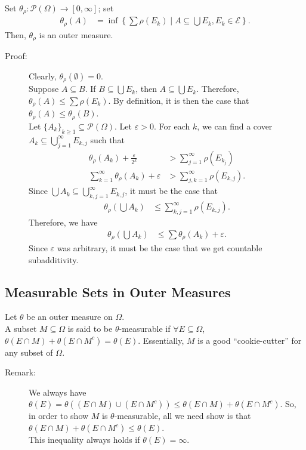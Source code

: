 \documentclass[10pt]{extarticle}
\begin{document}
  Set $\theta_{\rho}: \mathcal{P}(\Omega) \rightarrow [0,\infty]$; set
  \begin{align*}
    \theta_{\rho}(A) &= \inf \left\{\sum \rho(E_k)\mid A\subseteq \bigcup E_k,E_k\in \mathcal{E}\right\}.
  \end{align*}
  Then, $\theta_{\rho}$ is an outer measure.
  \begin{description}
    \item[Proof:] Clearly, $\theta_{\rho}(\emptyset) = 0$.\\

      Suppose $A\subseteq B$. If $B\subseteq \bigcup E_k$, then $A\subseteq \bigcup E_k$. Therefore, $\theta_{\rho}(A)\leq \sum \rho(E_k)$. By definition, it is then the case that $\theta_{\rho}(A)\leq \theta_{\rho}(B)$.\\

      Let $\{A_k\}_{k\geq 1}\subseteq \mathcal{P}(\Omega)$. Let $\varepsilon > 0$. For each $k$, we can find a cover $A_k\subseteq \bigcup_{j=1}^{\infty} E_{k,j}$ such that
      \begin{align*}
        \theta_{\rho}(A_k) + \frac{\varepsilon}{2^k} &> \sum_{j=1}^{\infty}\rho(E_{k_j})\\
        \sum_{k=1}^{\infty}\theta_{\rho}(A_k) + \varepsilon &> \sum_{j,k=1}^{\infty}\rho(E_{k,j}).
      \end{align*}
      Since $\bigcup A_k \subseteq \bigcup_{k,j=1}^{\infty}E_{k,j}$, it must be the case that
      \begin{align*}
        \theta_{\rho}\left(\bigcup A_k\right) &\leq \sum_{k,j=1}^{\infty}\rho(E_{k,j}).
      \end{align*}
      Therefore, we have
      \begin{align*}
        \theta_{\rho}\left(\bigcup A_k\right) &\leq \sum \theta_{\rho}(A_k) + \varepsilon.
      \end{align*}
      Since $\varepsilon$ was arbitrary, it must be the case that we get countable subadditivity.
  \end{description}
  \subsection{Measurable Sets in Outer Measures}%
  Let $\theta$ be an outer measure on $\Omega$.\\

  A subset $M\subseteq \Omega$ is said to be $\theta$-measurable if $\forall E\subseteq \Omega$, $\theta(E\cap M) + \theta(E\cap M^{c}) = \theta(E)$. Essentially, $M$ is a good ``cookie-cutter'' for any subset of $\Omega$.
  \begin{description}
    \item[Remark:] We always have $\theta(E) = \theta\left((E\cap M)\cup (E\cap M^{c})\right) \leq \theta(E\cap M) + \theta(E\cap M^{c})$. So, in order to show $M$ is $\theta$-measurable, all we need show is that $\theta(E\cap M) + \theta(E\cap M^{c}) \leq \theta(E)$.\\

      This inequality always holds if $\theta(E) = \infty$.
  \end{description}
\end{document}
